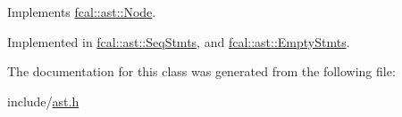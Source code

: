 Implements \hyperlink{classfcal_1_1ast_1_1Node_a81865f5a1df593708a39bf492952742a}{fcal\+::ast\+::\+Node}.



Implemented in \hyperlink{classfcal_1_1ast_1_1SeqStmts_af4d437d57e334a6500ae7639d6eefbcc}{fcal\+::ast\+::\+Seq\+Stmts}, and \hyperlink{classfcal_1_1ast_1_1EmptyStmts_abbccd9fb3e02082962774479fc47116d}{fcal\+::ast\+::\+Empty\+Stmts}.



The documentation for this class was generated from the following file\+:\begin{DoxyCompactItemize}
\item 
include/\hyperlink{ast_8h}{ast.\+h}\end{DoxyCompactItemize}
